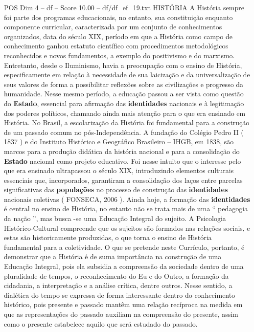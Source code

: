 \begin{textsample}{POS Dim 4 – df – Score 10.00 – df/df\_ef\_19.txt}  \label{ex:f4_pos_224}
HISTÓRIA A História sempre foi parte dos programas educacionais, no entanto, sua constituição enquanto componente curricular, caracterizada por um conjunto de conhecimentos organizados, data do século XIX, período em que a História como campo de conhecimento ganhou estatuto científico com procedimentos metodológicos reconhecidos e novos fundamentos, a exemplo do positivismo e do marxismo.
Entretanto, desde o Iluminismo, havia a preocupação com o ensino de História, especificamente em relação à necessidade de sua laicização e da universalização de seus valores de forma a possibilitar reflexões sobre as civilizações e progresso da humanidade.
Nesse mesmo período, a educação passou a ser vista como questão do \textbf{Estado}, essencial para afirmação das \textbf{identidades} nacionais e à legitimação dos poderes políticos, chamando ainda mais atenção para o que era ensinado em História.
No Brasil, a escolarização da História foi fundamental para a construção de um passado comum no pós-Independência.
A fundação do Colégio Pedro II ( 1837 ) e do Instituto Histórico e Geográfico Brasileiro – IHGB, em 1838, são marcos para a produção didática da história nacional e para a consolidação do \textbf{Estado} nacional como projeto educativo.
Foi nesse intuito que o interesse pelo que era ensinado ultrapassou o século XIX, introduzindo elementos culturais essenciais que, incorporados, garantiram a consolidação dos laços entre parcelas significativas das \textbf{populações} no processo de construção das \textbf{identidades} nacionais coletivas ( FONSECA, 2006 ).
Ainda hoje, a formação das \textbf{identidades} é central no ensino de História, no entanto não se trata mais de uma “ pedagogia da nação ”, mas busca -se uma Educação Integral do sujeito.
A Psicologia Histórico-Cultural compreende que os sujeitos são formados nas relações sociais, e estas são historicamente produzidas, o que torna o ensino de História fundamental para a coletividade.
O que se pretende neste Currículo, portanto, é demonstrar que a História é de suma importância na construção de uma Educação Integral, pois ela subsidia a compreensão da sociedade dentro de uma pluralidade de tempos, o reconhecimento do Eu e do Outro, a formação da cidadania, a interpretação e a análise crítica, dentre outros.
Nesse sentido, a dialética do tempo se expressa de forma interessante dentro do conhecimento histórico, pois presente e passado mantêm uma relação recíproca na medida em que as representações do passado auxiliam na compreensão do presente, assim como o presente estabelece aquilo que será estudado do passado.

\end{textsample}

